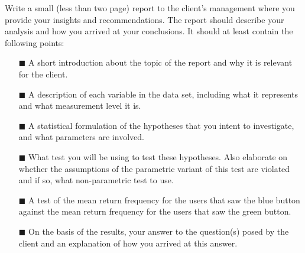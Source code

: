 Write a small (less than two page) report to the client's management where you provide your insights and recommendations. The report should describe your analysis and how you arrived at your conclusions. It should at least contain the following points: \\

\begin{itemize}
    \item[$\blacksquare$] A short introduction about the topic of the report and why it is relevant for the client.
    \item[$\blacksquare$] A description of each variable in the data set, including what it represents and what measurement level it is.  
    \item[$\blacksquare$] A statistical formulation of the hypotheses that you intent to investigate, and what parameters are involved.
    \item[$\blacksquare$] What test you will be using to test these hypotheses. Also elaborate on whether the assumptions of the parametric variant of this test are violated and if so, what non-parametric test to use.
    \item[$\blacksquare$] A test of the mean return frequency for the users that saw the blue button against the mean return frequency for the users that saw the green button.
    \item[$\blacksquare$] On the basis of the results, your answer to the question(s) posed by the client and an explanation of how you arrived at this answer.
\end{itemize}

\clearpage %